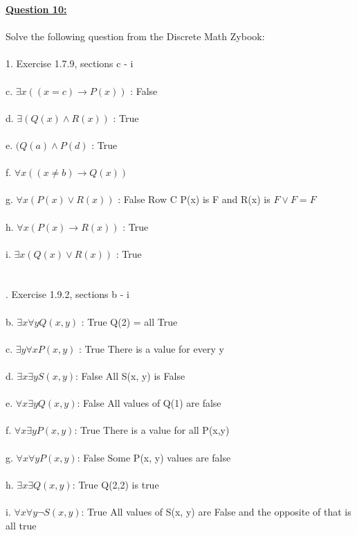\documentclass[11pt]{article}
\begin{document}
{\noindent \textbf{\ul{Question 10:}} \\
\\
Solve the following question from the Discrete Math Zybook:\\\\
1. Exercise 1.7.9, sections c - i \\\\
c. $\exists x((x = c) \rightarrow P(x))$ : False\\\\
d. $\exists(Q(x) \wedge R(x))$ : True\\\\
e. $(Q(a) \wedge P(d)$ : True\\\\
f. $\forall x((x \not = b) \rightarrow Q(x))$\\\\
g. $ \forall x(P(x) \vee R(x)) $ : False Row C P(x) is F and R(x) is $F \vee F = F$\\\\
h. $\forall x(P(x) \rightarrow R(x))$ : True\\\\
i. $\exists x(Q(x) \vee R(x))$ : True\\\\\\

. Exercise 1.9.2, sections b - i \\\\
b. $\exists x \forall y Q(x, y)$ : True Q(2) = all True \\\\
c. $\exists y \forall x P(x, y)$ : True There is a value for every y\\\\
d. $\exists x \exists y S(x, y)$: False All S(x, y) is False\\\\
e. $\forall x \exists y Q(x, y)$: False All values of Q(1) are false\\\\
f. $\forall x \exists y P(x, y)$: True There is a value for all P(x,y)\\\\
g. $\forall x \forall y P(x, y)$: False Some P(x, y) values are false\\\\
h. $\exists x \exists Q(x, y)$: True Q(2,2) is true\\\\
i. $\forall x \forall y {\displaystyle \neg} S(x, y)$: True All values of S(x, y) are False and the opposite of that is all true\\\\


}
\end{document}
